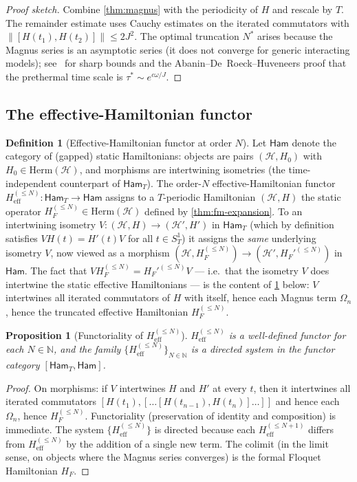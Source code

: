 \documentclass[12pt]{article}
\newtheorem{proposition}[theorem]{Proposition}
\theoremstyle{definition}
\newtheorem{definition}[theorem]{Definition}
\theoremstyle{remark}
\newcommand{\Hcal}{\mathcal{H}}
\newcommand{\N}{\mathbb{N}}
\newcommand{\HF}{H_{F}}
\newcommand{\Heff}{H_{\mathrm{eff}}}
\newcommand{\Ham}{\mathsf{Ham}}
\begin{document}
\begin{proof}[Proof sketch]
Combine \cref{thm:magnus} with the periodicity of $H$ and rescale by $T$. The remainder estimate uses Cauchy estimates on the iterated commutators with $\|[H(t_1),H(t_2)]\|\leq 2J^2$. The optimal truncation $N^*$ arises because the Magnus series is an asymptotic series (it does not converge for generic interacting models); see~\cite{bukov2015,abanin2015} for sharp bounds and the Abanin--De~Roeck--Huveneers proof that the prethermal time scale is $\tau^*\sim e^{c\omega/J}$.
\end{proof}

\subsection{The effective-Hamiltonian functor}

\begin{definition}[Effective-Hamiltonian functor at order $N$]
\label{def:Heff}
Let $\Ham$ denote the category of (gapped) static Hamiltonians: objects are pairs $(\Hcal,H_0)$ with $H_0\in\mathrm{Herm}(\Hcal)$, and morphisms are intertwining isometries (the time-independent counterpart of $\Ham_T$). The order-$N$ effective-Hamiltonian functor $\Heff^{(\leq N)}\colon \Ham_T \to \Ham$ assigns to a $T$-periodic Hamiltonian $(\Hcal,H)$ the static operator $\HF^{(\leq N)}\in\mathrm{Herm}(\Hcal)$ defined by \cref{thm:fm-expansion}. To an intertwining isometry $V\colon(\Hcal,H)\to(\Hcal',H')$ in $\Ham_T$ (which by definition satisfies $VH(t)=H'(t)V$ for all $t\in S^1_T$) it assigns the \emph{same} underlying isometry $V$, now viewed as a morphism $(\Hcal,\HF^{(\leq N)})\to(\Hcal',\HF'^{(\leq N)})$ in $\Ham$. The fact that $V\HF^{(\leq N)} = \HF'^{(\leq N)} V$ --- i.e.\ that the isometry $V$ does intertwine the static effective Hamiltonians --- is the content of \cref{prop:heff-functor} below: $V$ intertwines all iterated commutators of $H$ with itself, hence each Magnus term $\Omega_n$, hence the truncated effective Hamiltonian $\HF^{(\leq N)}$.
\end{definition}

\begin{proposition}[Functoriality of $\Heff^{(\leq N)}$]
\label{prop:heff-functor}
$\Heff^{(\leq N)}$ is a well-defined functor for each $N\in\N$, and the family $\{\Heff^{(\leq N)}\}_{N\in\N}$ is a directed system in the functor category $[\Ham_T,\Ham]$.
\end{proposition}

\begin{proof}
On morphisms: if $V$ intertwines $H$ and $H'$ at every $t$, then it intertwines all iterated commutators $[H(t_1),[\dots[H(t_{n-1}),H(t_n)]\dots]]$ and hence each $\Omega_n$, hence $\HF^{(\leq N)}$. Functoriality (preservation of identity and composition) is immediate. The system $\{\Heff^{(\leq N)}\}$ is directed because each $\Heff^{(\leq N+1)}$ differs from $\Heff^{(\leq N)}$ by the addition of a single new term. The colimit (in the limit sense, on objects where the Magnus series converges) is the formal Floquet Hamiltonian $\HF$.
\end{proof}
\end{document}
